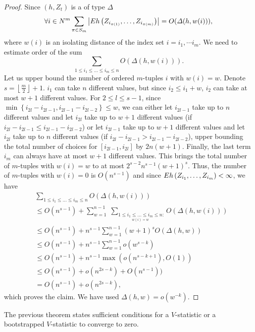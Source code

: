 \begin{proof}
Since  $(h,Z_{t})$ is a  of type $\varDelta$
\[
\forall i \in N^{m} \sum_{\pi\in S_{m}}\left| E h\left(Z_{i_{\pi(1)}},\ldots,Z_{i_{\pi(m)}}\right)\right| = O( \varDelta(h,w(i)) ),
\]
where $w(i)$ is an isolating distance of the index set $i = i_1,\cdots i_m$. We need to estimate order of the sum 
\begin{equation*}
 \sum_{1\leq i_{1}\leq\ldots\leq i_{m}\leq n}  O( \varDelta(h,w(i)) ).
\end{equation*}
Let us upper bound the number of ordered $m$-tuples $i$ with $w(i)=w$.  Denote $s=\left\lfloor \frac{m}{2}\right\rfloor +1$. 
$i_{1}$ can take $n$ different values, but since $i_{2}\leq i_{1}+w$,
$i_{2}$ can take at most $w+1$ different values.
For $2\leq l\leq s-1$, since $\min\left\{ i_{2l}-i_{2l-1},i_{2l-1}-i_{2l-2}\right\} \leq w$,
we can either let $i_{2l-1}$ take up to $n$ different values and
let $i_{2l}$ take up to $w+1$ different values (if $i_{2l}-i_{2l-1}\leq i_{2l-1}-i_{2l-2}$)
or let $i_{2l-1}$ take up to $w+1$ different values and let $i_{2l}$
take up to $n$ different values (if $i_{2l}-i_{2l-1}>i_{2l-1}-i_{2l-2}$),
upper bounding the total number of choices for $\left[i_{2l-1},i_{2l}\right]$
by $2n(w+1)$. Finally, the last term $i_{m}$ can always have at
most $w+1$ different values.  
This brings the total number of $m$-tuples with $w(i)=w$ to at most $2^{\ensuremath{s-2}}n^{s-1}(w+1)^{s}$.
Thus, the number of $m$-tuples with $w(i)=0$ is $O(n^{s-1})$ and
since $E  h\left(Z_{i_{1}},\ldots,Z_{i_{m}}\right) < \infty$, we have
\begin{align*}
 &  \sum_{1\leq i_{1}\leq\ldots\leq i_{m}\leq n}O( \varDelta(h,w(i)) )\\
 & \leq O(n^{s-1})+\sum_{w=1}^{n-1}\;\sum_{\underset{w(i)=w}{1\leq i_{1}\leq\ldots\leq i_{m}\leq n}:} O( \varDelta(h,w(i)) )\\
 & \leq O(n^{s-1})+ n^{s-1}\sum_{w=1}^{n-1}(w+1)^{s} O(\varDelta(h,w))\\
 & \leq O(n^{s-1})+n^{s-1}\sum_{w=1}^{n-1}o(w^{s-k})\\
 & \leq O(n^{s-1})+n^{s-1}\max( o(n^{s-k+1}),O(1))\\
  & \leq O(n^{s-1})+o(n^{2s-k})+ O(n^{s-1}))\\
 &=  O(n^{s-1})+o(n^{2s-k}),
\end{align*}
which proves the claim. We have used $\varDelta(h,w)=o(w^{-k})$. 
\end{proof}
The previous theorem states sufficient conditions for a $V$-statistic  or a bootstrapped $V$-statistic to  converge to zero.
